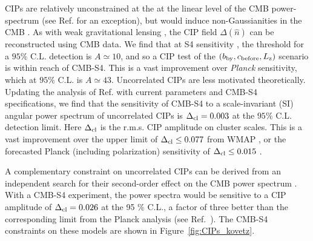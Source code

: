 CIPs are relatively unconstrained at the at the linear level of the CMB power-spectrum (see Ref. \cite{Munoz:2015fdv} for an exception), but would induce non-Gaussianities in the CMB \cite{Grin:2011nk,Grin:2011tf,Grin:2013uya,He:2015msa}. As with weak gravitational lensing \cite{Hu:2001kj}, the CIP field $\Delta(\hat{n})$ can be reconstructed using CMB data. We find that at S4 sensitivity \cite{He:2015msa}, the threshold for a $95\%$ C.L. detection is $A\simeq 10$, and so a CIP test of the $(b_{\rm by}, c_{\rm before}, L_{\rm z})$ scenario is within reach of CMB-S4. This is a vast improvement over \emph{Planck} sensitivity, which at $95\%$ C.L. is $A\simeq 43$. Uncorrelated CIPs are less  motivated theoretically. Updating the analysis of Ref. \cite{He:2015msa} with current parameters \cite{Ade:2015lrj} and CMB-S4 specifications, we find that the sensitivity of CMB-S4 to a scale-invariant (SI) angular power spectrum of uncorrelated CIPs is $\Delta_{\rm cl}=0.003$ at the $95\%$ C.L. detection limit. Here $\Delta_{\rm cl}$ is the r.m.s. CIP amplitude on cluster scales. This is a vast improvement over the upper limit of $\Delta_{\rm cl}\leq 0.077$ from WMAP \cite{Grin:2013uya}, or the forecasted Planck \cite{Ade:2015lrj} (including polarization) sensitivity of $\Delta_{\rm cl}\leq 0.015$ \cite{He:2015msa}. 

A complementary constraint on uncorrelated CIPs can be derived from an independent search for their second-order effect on the CMB power spectrum \cite{Munoz:2015fdv}. With a CMB-S4 experiment, the power spectra would be sensitive to a CIP amplitude of $\Delta_{\rm cl} = 0.026$ at the 95 \% C.L., a factor of three better than the corresponding limit from the Planck analysis (see Ref.~\cite{Munoz:2015fdv}). The CMB-S4 constraints on these models are shown in Figure~\ref{fig:CIPs_kovetz}.






